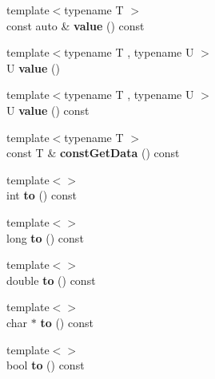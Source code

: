 \begin{DoxyCompactItemize}
\item 
\mbox{\label{classzany_1_1_entity_a416ef68c2f2d7cc99050bb7010aa9fdd}} 
{\footnotesize template$<$typename T $>$ }\\const auto \& {\bfseries value} () const
\item 
\mbox{\label{classzany_1_1_entity_a4b46d65306ba9028581d7e4791300d1a}} 
{\footnotesize template$<$typename T , typename U $>$ }\\U {\bfseries value} ()
\item 
\mbox{\label{classzany_1_1_entity_a276a87b238a0e68824988aa8940eea7d}} 
{\footnotesize template$<$typename T , typename U $>$ }\\U {\bfseries value} () const
\item 
\mbox{\label{classzany_1_1_entity_ae743c8b1cdf54d3cc9b2eabcc5ade641}} 
{\footnotesize template$<$typename T $>$ }\\const T \& {\bfseries const\+Get\+Data} () const
\item 
\mbox{\label{classzany_1_1_entity_a26594f38171700d5f00d4770bc8056e1}} 
{\footnotesize template$<$$>$ }\\int {\bfseries to} () const
\item 
\mbox{\label{classzany_1_1_entity_a38cba4eaebbb8f358d47952ed96d615b}} 
{\footnotesize template$<$$>$ }\\long {\bfseries to} () const
\item 
\mbox{\label{classzany_1_1_entity_a52abac40f3107b9cfca3b2812a03e716}} 
{\footnotesize template$<$$>$ }\\double {\bfseries to} () const
\item 
\mbox{\label{classzany_1_1_entity_a19a9eafff1b66ac2f3f8c576e988cef8}} 
{\footnotesize template$<$$>$ }\\char $\ast$ {\bfseries to} () const
\item 
\mbox{\label{classzany_1_1_entity_a0a627b6067bb23265a6bbca33ecc91db}} 
{\footnotesize template$<$$>$ }\\bool {\bfseries to} () const

\end{DoxyCompactItemize}
